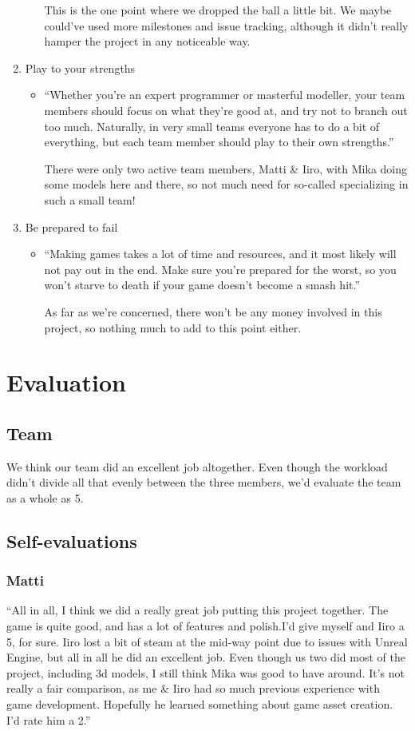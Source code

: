 \documentclass[
  oneside,
  11pt, a4paper,
  footinclude=true,
  headinclude=true,
  cleardoublepage=empty
]{scrbook}
\begin{document}
\begin{enumerate}
\begin{itemize}
    \medskip
    This is the one point where we dropped the ball a little bit. We maybe could've used more milestones and issue tracking, although it didn't really hamper the project in any noticeable way.
    \end{itemize}
\item Play to your strengths
    \begin{itemize}
    \item ``Whether you're an expert programmer or masterful modeller, your team members should focus on what they're good at, and try not to branch out too much. Naturally, in very small teams everyone has to do a bit of everything, but each team member should play to their own strengths.''
    
    \medskip
    There were only two active team members, Matti \& Iiro, with Mika doing some models here and there, so not much need for so-called specializing in such a small team!
    \end{itemize}
\item  Be prepared to fail 
    \begin{itemize}
    \item ``Making games takes a lot of time and resources, and it most likely will not pay out in the end. Make sure you're prepared for the worst, so you won't starve to death if your game doesn't become a smash hit.''
    
    \medskip
    As far as we're concerned, there won't be any money involved in this project, so nothing much to add to this point either.
    \end{itemize}
\end{enumerate}


\chapter{Evaluation}
\section{Team}
We think our team did an excellent job altogether. Even though the workload didn't divide all that evenly between the three members, we'd evaluate the team as a whole as 5.
\section{Self-evaluations}
\subsection{Matti}
``All in all, I think we did a really great job putting this project together. The game is quite good, and has a lot of features and polish.I'd give myself and Iiro a 5, for sure. Iiro lost a bit of steam at the mid-way point due to issues with Unreal Engine, but all in all he did an excellent job. Even though us two did most of the project, including 3d models, I still think Mika was good to have around. It's not really a fair comparison, as me \& Iiro had so much previous experience with game development. Hopefully he learned something about game asset creation. I'd rate him a 2.''
\end{document}
